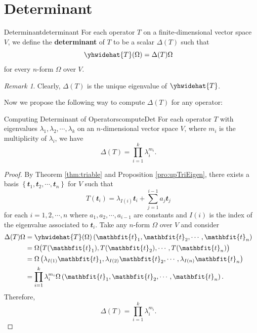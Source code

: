 \documentclass[math, code]{amznotes}
\theoremstyle{remark}
\newtheorem*{remark}{Remark}
\begin{document}
\section{Determinant}
\begin{dfnbox}{Determinant}{determinant}
    For each operator $T$ on a finite-dimensional vector space $V$, we define the {\color{red} \textbf{determinant}} of $T$ to be a scalar $\Delta(T)$ such that 
    \begin{equation*}
        \yhwidehat{T}(\Omega) = \Delta(T)\Omega
    \end{equation*}
    for every $n$-form $\Omega$ over $V$.
\end{dfnbox}
\begin{notebox}
    \begin{remark}
        Clearly, $\Delta(T)$ is the unique eigenvalue of $\yhwidehat{T}$.
    \end{remark}
\end{notebox}
Now we propose the following way to compute $\Delta(T)$ for any operator:
\begin{probox}{Computing Determinant of Operators}{computeDet}
    For each operator $T$ with eigenvalues $\lambda_1, \lambda_2, \cdots, \lambda_k$ on an $n$-dimensional vector space $V$, where $m_i$ is the multiplicity of $\lambda_i$, we have 
    \begin{equation*}
        \Delta(T) = \prod_{i = 1}^{k}\lambda_i^{m_i}.
    \end{equation*}
    \tcblower
    \begin{proof}
        By Theorem \ref{thm:triable} and Proposition \ref{pro:upTriEigen}, there exists a basis $\left\{\mathbfit{t}_1, \mathbfit{t}_2, \cdots, \mathbfit{t}_n\right\}$ for $V$ such that 
        \begin{equation*}
            T\left(\mathbfit{t}_i\right) = \lambda_{I(i)}\mathbfit{t}_i + \sum_{j = 1}^{i - 1}a_j\mathbfit{t}_j
        \end{equation*}
        for each $i = 1, 2, \cdots, n$ where $a_1, a_2, \cdots, a_{i - 1}$ are constants and $I(i)$ is the index of the eigenvalue associated to $\mathbfit{t}_i$. Take any $n$-form $\Omega$ over $V$ and consider 
        \begin{align*}
            \Delta(T)\Omega & = \yhwidehat{T}(\Omega)\left(\mathbfit{t}_1, \mathbfit{t}_2, \cdots, \mathbfit{t}_n\right) \\
            & = \Omega\bigl(T(\mathbfit{t}_1), T(\mathbfit{t}_2), \cdots, T(\mathbfit{t}_n)\bigr) \\
            & = \Omega\left(\lambda_{I(1)}\mathbfit{t}_1, \lambda_{I(2)}\mathbfit{t}_2, \cdots, \lambda_{I(n)}\mathbfit{t}_n\right) \\
            & = \prod_{i = 1}^k\lambda_i^{m_i}\Omega\left(\mathbfit{t}_1, \mathbfit{t}_2, \cdots, \mathbfit{t}_n\right).
        \end{align*}
        Therefore, 
        \begin{equation*}
            \Delta(T) = \prod_{i = 1}^{k}\lambda_i^{m_i}.
        \end{equation*}
    \end{proof}
\end{probox}
\end{document}
